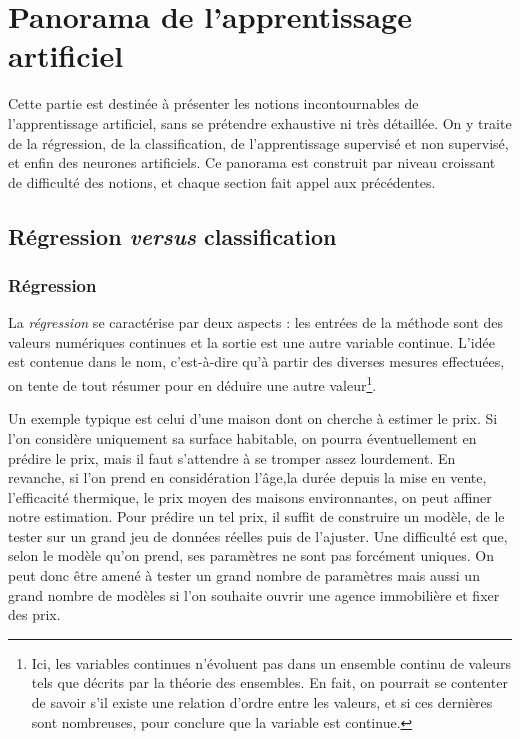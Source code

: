 \chapter{Panorama de l'apprentissage artificiel}

Cette partie est destinée à présenter les notions incontournables de l'apprentissage artificiel, sans se prétendre exhaustive ni très détaillée. On y traite de la régression, de la classification, de l'apprentissage supervisé et non supervisé, et enfin des neurones artificiels. Ce panorama est construit par niveau croissant de difficulté des notions, et chaque section fait appel aux précédentes.

\section{Régression \textit{versus} classification}
\subsection{Régression}

La \emph{régression} se caractérise par deux aspects : les entrées de la méthode sont des valeurs numériques continues et la sortie est une autre variable continue. L'idée est contenue dans le nom, c'est-à-dire qu'à partir des diverses mesures effectuées, on tente de tout résumer pour en déduire une autre valeur\footnote{Ici, les variables continues n'évoluent pas dans un ensemble continu de valeurs tels que décrits par la théorie des ensembles. En fait, on pourrait se contenter de savoir s'il existe une relation d'ordre entre les valeurs, et si ces dernières sont nombreuses, pour conclure que la variable est continue.}.

Un exemple typique est celui d'une maison dont on cherche à estimer le prix. Si l'on considère uniquement sa surface habitable, on pourra éventuellement en prédire le prix, mais il faut s'attendre à se tromper assez lourdement. En revanche, si l'on prend en considération l'âge,la durée depuis la mise en vente, l'efficacité thermique, le prix moyen des maisons environnantes, on peut affiner notre estimation. Pour prédire un tel prix, il suffit de construire un modèle, de le tester sur un grand jeu de données réelles puis de l'ajuster. Une difficulté est que, selon le modèle qu'on prend, ses paramètres ne sont pas forcément uniques. On peut donc être amené à tester un grand nombre de paramètres mais aussi un grand nombre de modèles si l'on souhaite ouvrir une agence immobilière et fixer des prix.

